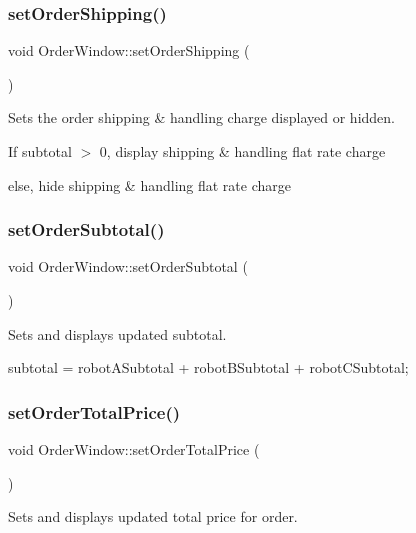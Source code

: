 \subsubsection{\texorpdfstring{setOrderShipping()}{setOrderShipping()}}
{\footnotesize\ttfamily void Order\+Window\+::set\+Order\+Shipping (\begin{DoxyParamCaption}{ }\end{DoxyParamCaption})}



Sets the order shipping \& handling charge displayed or hidden. 

If subtotal $>$ 0, display shipping \& handling flat rate charge

else, hide shipping \& handling flat rate charge \mbox{\label{class_order_window_a9b1e24f50bfc70c3920932f58331f917}} 
\subsubsection{\texorpdfstring{setOrderSubtotal()}{setOrderSubtotal()}}
{\footnotesize\ttfamily void Order\+Window\+::set\+Order\+Subtotal (\begin{DoxyParamCaption}{ }\end{DoxyParamCaption})}



Sets and displays updated subtotal. 

subtotal = robot\+A\+Subtotal + robot\+B\+Subtotal + robot\+C\+Subtotal; \mbox{\label{class_order_window_af1b6d198cf89a68c63afa28bc986786a}} 
\subsubsection{\texorpdfstring{setOrderTotalPrice()}{setOrderTotalPrice()}}
{\footnotesize\ttfamily void Order\+Window\+::set\+Order\+Total\+Price (\begin{DoxyParamCaption}{ }\end{DoxyParamCaption})}



Sets and displays updated total price for order. 

